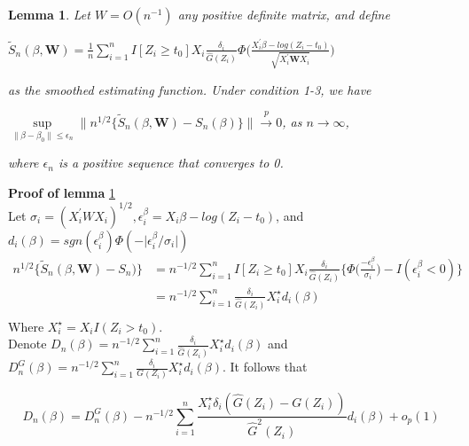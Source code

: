 \documentclass[12pt]{article}
\newtheorem{lemma}[theorem]{Lemma}
\begin{document}
	\begin{lemma} \label{lemma:1}
		Let $ W=O(n^{-1})$ any positive definite matrix, and define
		\begin{center}
			$\tilde{S}_n(\beta, \textbf{W})=\frac{1}{n} \sum_{i=1}^{n} I[Z_i \geq t_0] X_i \frac{\delta_i}{\hat{G}(Z_i)}\Phi\Big(\frac{X_i^\prime\beta-log(Z_i-t_0)}{\sqrt{X_i^{\prime} \textbf{W}X_{i}}}\Big)$
		\end{center}
		as the smoothed estimating function. Under condition 1-3, we have
		\begin{center}
			$\sup\limits_{\lVert \beta - \beta_0 \rVert \leq \epsilon_n} \lVert {n^{1/2}} \{ \tilde{S}_n(\beta, \textbf{W})-S_n(\beta) \} \rVert \xrightarrow{p} 0$, as $n\to\infty$,		
		\end{center}
		where ${\epsilon_n}$ is a positive sequence that converges to 0.
	\end{lemma}

	\noindent \textbf{Proof of lemma} \ref{lemma:1}\\
	Let $\sigma_i=(X_i^\prime W X_i)^{1/2}, \epsilon_i^\beta=X_i\beta-log(Z_i-t_0)$, and $d_i(\beta)=sgn(\epsilon_i^\beta)\Phi(-\lvert\epsilon_i^\beta/\sigma_i\rvert)$\\
	\begin{align*}
	n^{1/2}\{ \tilde{S}_n(\beta, \textbf{W})-S_n)\} & = n^{-1/2} \sum_{i=1}^{n}I[Z_i \geq t_0] X_i \frac{\delta_i}{\hat{G}(Z_i)}\bigg\{ \Phi \bigg(\frac{-\epsilon_i^\beta}{\sigma_i}\bigg)-I(\epsilon_i^\beta<0) \bigg\}\\
	& = n^{-1/2} \sum_{i=1}^{n} \frac{\delta_i}{\hat{G}(Z_i)} X_i^\star d_i(\beta)\\
	\end{align*}
	\noindent Where $X_i^\star = X_i I(Z_i>t_0)$.\\
	
	\noindent Denote $D_n(\beta)=n^{-1/2} \sum_{i=1}^{n}\frac{\delta_i}{\hat{G}(Z_i)} X_i^\star d_i(\beta)$ and $D_n^G(\beta)=n^{-1/2} \sum_{i=1}^{n} \frac{\delta_i}{G(Z_i)} X_i^\star d_i(\beta)$. It follows that
	
	\begin{equation} \label{eq:8}
	D_n(\beta)=D_n^G(\beta)-n^{-1/2} \sum_{i=1}^{n}\frac{X_i^\star\delta_i(\hat{G}(Z_i)-G(Z_i))}{\hat{G}^2(Z_i)}d_i(\beta)+o_p(1)
	\end{equation}
	
\end{document}
